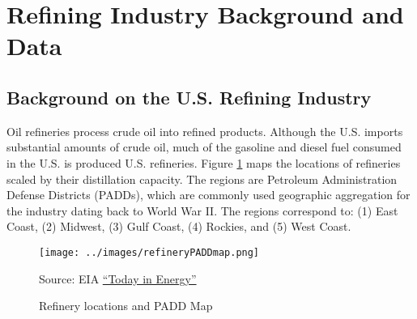 \documentclass[12pt]{article}
\begin{document}
\section{Refining Industry Background and Data \label{App:Background}}

\setcounter{table}{0} \renewcommand{\thetable}{\Alph{section}.\arabic{table}}
\setcounter{figure}{0} \renewcommand{\thefigure}{\Alph{section}.\arabic{figure}}

\subsection{Background on the U.S. Refining Industry}

Oil refineries process crude oil into refined products.  Although the U.S. imports substantial amounts of crude oil, much of the gasoline and diesel fuel consumed in the U.S. is produced U.S. refineries.  Figure \ref{fig:PADD_map} maps the locations of refineries scaled by their distillation capacity. The regions are Petroleum Administration Defense Districts (PADDs), which are commonly used geographic aggregation for the industry dating back to World War II. The regions correspond to: (1) East Coast, (2) Midwest, (3) Gulf Coast, (4) Rockies, and (5) West Coast.

\begin{figure}[]
\begin{centering}
\caption{Refinery locations and PADD Map \label{fig:PADD_map}}
\texttt{[image: ../images/refineryPADDmap.png]}
\par\end{centering}
\vspace{4pt}
\scriptsize
Source: EIA \href{https://www.eia.gov/todayinenergy/detail.php?id=7170}{``Today in Energy''}
\end{figure}
\end{document}
